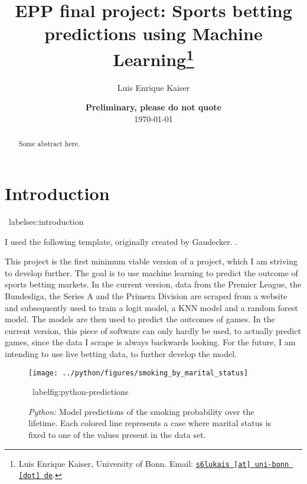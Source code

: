 \documentclass[11pt, a4paper, leqno]{article}
\begin{document}
\title{EPP final project: Sports betting predictions using Machine Learning\thanks{Luis Enrique Kaiser, University of Bonn. Email: \href{mailto:s6lukais@uni-bonn.de}{\nolinkurl{s6lukais [at] uni-bonn [dot] de}}.}}

\author{Luis Enrique Kaiser}

\date{
    {\bf Preliminary, please do not quote}
    \\[1ex]
    \today
}

\maketitle


\begin{abstract}
    Some abstract here.
\end{abstract}

\clearpage


\section{Introduction} %
\ label{sec:introduction}

I used the following template, originally created by Gaudecker. \citet{GaudeckerEconProjectTemplates}.

This project is the first minimum viable version of a project, which I am striving to develop further.
The goal is to use machine learning to predict the outcome of sports betting markets. In the current version,
data from the Premier League, the Bundesliga, the Series A and the Primera Division are scraped from a website and
subsequently used to train a logit model, a KNN model and a random forest model. The models are then used to predict the outcomes of games.
In the current version, this piece of software can only hardly be used, to actually predict games, since the data I scrape is always backwards looking.
For the future, I am intending to use live betting data, to further develop the model.

\begin{figure}[H]

    \centering
    \texttt{[image: ../python/figures/smoking\_by\_marital\_status]}

    \caption{\emph{Python:} Model predictions of the smoking probability over the
        lifetime. Each colored line represents a case where marital status is fixed to one
        of the values present in the data set.}
    \ label{fig:python-predictions}

\end{figure}
\end{document}
